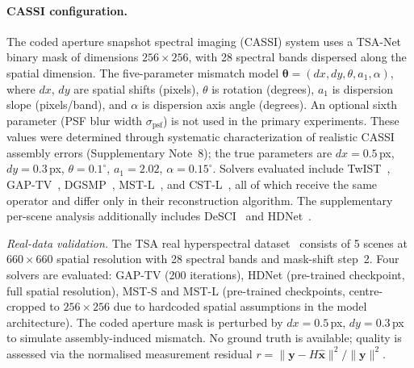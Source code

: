 \documentclass[11pt]{article}
\newcommand{\mismatchparam}{\boldsymbol{\theta}}
\begin{document}
\paragraph{CASSI configuration.}
\begin{sloppypar}
The coded aperture snapshot spectral imaging (CASSI) system uses a TSA-Net
binary mask of dimensions $256 \times 256$, with 28 spectral bands
dispersed along the spatial dimension.  The five-parameter mismatch model
$\mismatchparam = (dx, dy, \theta, a_1, \alpha)$,
where $dx$, $dy$ are spatial shifts (pixels), $\theta$ is rotation (degrees),
$a_1$ is dispersion slope (pixels/band), and $\alpha$ is dispersion axis angle (degrees).
An optional sixth parameter (PSF blur width $\sigma_{\text{psf}}$) is not used in the primary experiments.
These values were determined through systematic characterization of realistic CASSI
assembly errors (Supplementary Note~8); the true parameters are
$dx{=}0.5$\,px, $dy{=}0.3$\,px, $\theta{=}0.1^\circ$, $a_1{=}2.02$, $\alpha{=}0.15^\circ$.
Solvers evaluated include TwIST~\cite{bioucasdias2007twist}, GAP-TV~\cite{yuan2016gaptv},
DGSMP~\cite{huang2021dgsmp}, MST-L~\cite{cai2022mst}, and CST-L~\cite{cai2022cst},
all of which receive the same operator and differ only in their reconstruction algorithm.
The supplementary per-scene analysis additionally includes DeSCI~\cite{liu2019rank} and HDNet~\cite{hu2022hdnet}.
\end{sloppypar}

\begin{sloppypar}
\textit{Real-data validation.}
The TSA real hyperspectral dataset~\cite{wagadarikar2008cassi} consists of
5 scenes at $660 \times 660$ spatial resolution with 28 spectral bands
and mask-shift step~2.  Four solvers are evaluated: GAP-TV (200 iterations),
HDNet (pre-trained checkpoint, full spatial resolution), MST-S and MST-L
(pre-trained checkpoints, centre-cropped to $256 \times 256$ due to
hardcoded spatial assumptions in the model architecture).  The coded
aperture mask is perturbed by $dx = 0.5$\,px, $dy = 0.3$\,px to simulate
assembly-induced mismatch.  No ground truth is available; quality is
assessed via the normalised measurement residual $r = \|\mathbf{y} - H\hat{\mathbf{x}}\|^2 / \|\mathbf{y}\|^2$.
\end{sloppypar}
\end{document}

